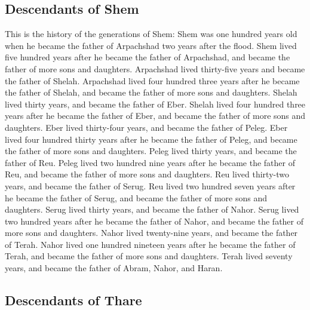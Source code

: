 \hypertarget{descendants-of-shem}{%
\subsection{Descendants of Shem}\label{descendants-of-shem}}

 This is the history of the generations of Shem: Shem was
one hundred years old when he became the father of Arpachshad two years
after the flood.  Shem lived five hundred years after he
became the father of Arpachshad, and became the father of more sons and
daughters.  Arpachshad lived thirty-five years and became
the father of Shelah.  Arpachshad lived four hundred
three years after he became the father of Shelah, and became the father
of more sons and daughters.  Shelah lived thirty years,
and became the father of Eber.  Shelah lived four hundred
three years after he became the father of Eber, and became the father of
more sons and daughters.  Eber lived thirty-four years,
and became the father of Peleg.  Eber lived four hundred
thirty years after he became the father of Peleg, and became the father
of more sons and daughters.  Peleg lived thirty years,
and became the father of Reu.  Peleg lived two hundred
nine years after he became the father of Reu, and became the father of
more sons and daughters.  Reu lived thirty-two years, and
became the father of Serug.  Reu lived two hundred seven
years after he became the father of Serug, and became the father of more
sons and daughters.  Serug lived thirty years, and became
the father of Nahor.  Serug lived two hundred years after
he became the father of Nahor, and became the father of more sons and
daughters.  Nahor lived twenty-nine years, and became the
father of Terah.  Nahor lived one hundred nineteen years
after he became the father of Terah, and became the father of more sons
and daughters.  Terah lived seventy years, and became the
father of Abram, Nahor, and Haran.

\hypertarget{descendants-of-thare}{%
\subsection{Descendants of Thare}\label{descendants-of-thare}}

